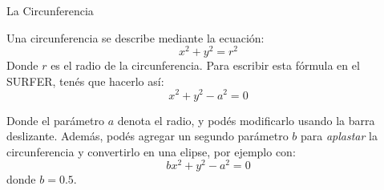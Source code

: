 \documentclass[es]{SurferDesc}%
\begin{document}
\footnotesize
%


\begin{surferPage}
  \begin{surferTitle}La Circunferencia\end{surferTitle}
   \begin{surferText}
   
Una circunferencia se describe mediante la ecuaci{\'o}n:
\[x^2+y^2=r^2\]
Donde $r$ es el radio de la circunferencia. 
Para escribir esta f{\'o}rmula en el SURFER, tenés que hacerlo as{\'i}:
\[x^2+y^2-a^2=0\]

Donde el par{\'a}metro $a$ denota el radio, y pod{\'e}s modificarlo usando la barra deslizante. Además, pod{\'e}s agregar un segundo par{\'a}metro $b$ para {\it aplastar} la circunferencia y convertirlo en una elipse, por ejemplo con:
\[bx^2+y^2-a^2=0\] donde $b=0.5$.


     \end{surferText}
\end{surferPage}
\end{document}
